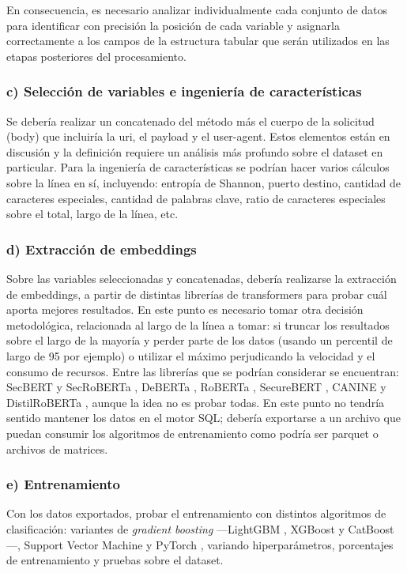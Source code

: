 \documentclass[12pt]{article}
\begin{document}
En consecuencia, es necesario analizar individualmente cada conjunto de datos para identificar con precisión la posición de cada variable y asignarla correctamente a los campos de la estructura tabular que serán utilizados en las etapas posteriores del procesamiento.

\subsubsection*{c) Selección de variables e ingeniería de características}
Se debería realizar un concatenado del método más el cuerpo de la solicitud (body) que incluiría la uri, el payload y el user-agent. Estos elementos están en discusión y la definición requiere un análisis más profundo sobre el dataset en particular.
Para la ingeniería de características se podrían hacer varios cálculos sobre la línea en sí, incluyendo: entropía de Shannon, puerto destino, cantidad de caracteres especiales, cantidad de palabras clave, ratio de caracteres especiales sobre el total, largo de la línea, etc. 

\subsubsection*{d) Extracción de embeddings}
Sobre las variables seleccionadas y concatenadas, debería realizarse la extracción de embeddings, a partir de distintas librerías de transformers para probar cuál aporta mejores resultados. En este punto es necesario tomar otra decisión metodológica, relacionada al largo de la línea a tomar: si truncar los resultados sobre el largo de la mayoría y perder parte de los datos (usando un percentil de largo de 95 por ejemplo) o utilizar el máximo perjudicando la velocidad y el consumo de recursos. Entre las librerías que se podrían considerar se encuentran: SecBERT y SecRoBERTa \cite{jackaduma2022secbert}, DeBERTa \cite{he2021deberta},
RoBERTa \cite{liu2019roberta}, SecureBERT \cite{aghaei2023securebert},
CANINE \cite{clark2022canine} y DistilRoBERTa \cite{sanh2019distilbert}, aunque la idea no es probar todas.
En este punto no tendría sentido mantener los datos en el motor SQL; debería exportarse a un archivo que puedan consumir los algoritmos de entrenamiento como podría ser parquet o archivos de matrices.

\subsubsection*{e) Entrenamiento}
Con los datos exportados, probar el entrenamiento con distintos algoritmos de clasificación: variantes de \textit{gradient boosting} —LightGBM \cite{ke2017lightgbm}, XGBoost \cite{chen2016xgboost} y CatBoost
\cite{prokhorenkova2018catboost}—, Support Vector Machine \cite{cortes1995svm} y PyTorch \cite{paszke2019pytorch}, variando hiperparámetros, porcentajes de entrenamiento y pruebas sobre el dataset.
\end{document}
